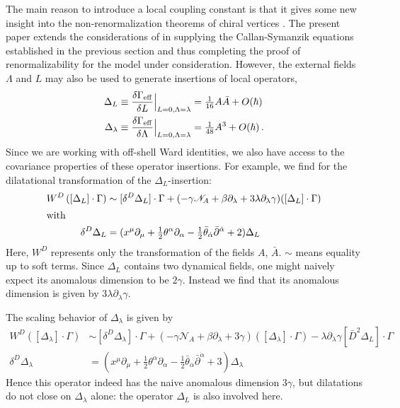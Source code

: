 \documentclass[a4paper,12pt]{article}
\newcommand{\N}{{\mathscr N}}
\def\pr{\partial}
\newcommand{\half}{{\textstyle \frac{1}{2}}}
\newcommand{\Geff}{\Gamma_{\rm eff}}
\newcommand{\al}{\alpha}
\newcommand{\da}{{\dot\alpha}}
\newcommand{\tfr}[2]{{\textstyle \frac{#1}{#2}}}
\newcommand{\fdq}[2]{\frac{\delta #1}{\delta #2}}
\begin{document}
The main reason to introduce a local coupling constant is that it gives
some new insight into the non-renormalization theorems of chiral vertices
\cite{FK}. The present paper extends the considerations of \cite{FK} in
supplying the Callan-Symanzik equations established in the previous
section and thus completing the proof of renormalizability for the model
under consideration.
However, the external fields $\Lambda$ and $L$ may also be used to generate
insertions of local operators,
\begin{align}
\Delta_L &\equiv \fdq{\Geff}{L} \Bigr|_{L=0,\Lambda=\lambda} = \tfr{1}{16} A \bar A + O(\hbar)\\
\Delta_\lambda &\equiv \fdq{\Geff}{\Lambda} \Bigr|_{L=0,\Lambda=\lambda} = \tfr{1}{48} A^3 + O(\hbar)\,.
\end{align}
Since we are working with off-shell Ward
identities, we also have access to the covariance properties of these
operator insertions. 
For example, we find for the dilatational transformation of the
$\Delta_L$-insertion: 
\begin{align}
W^D \left( [\Delta_L]\cdot \Gamma\right) &\sim [\delta^D \Delta_L]\cdot \Gamma
+ (-\gamma \N_A + \beta \pr_\lambda + 3 \lambda \pr_\lambda \gamma)
([\Delta_L]\cdot\Gamma) \label{DeltaLtrans}\\
\intertext{with}
\delta^D \Delta_L &= (x^\mu\pr_\mu + \half \theta^\al \pr_\al -\half
\bar\theta_\da \bar\pr^\da +2) \Delta_L \label{DeltaLtransD}
\end{align}
Here, $W^D$ represents only the transformation of the fields $A$, $\bar
A$. $\sim$ means equality up to soft terms. 
Since $\Delta_L$ contains two dynamical fields, one might naively expect
its anomalous dimension to be $2\gamma$. Instead we find that its
anomalous dimension is given by $ 3 \lambda \pr_\lambda \gamma$.

The scaling behavior of $\Delta_\lambda$ is given by
\begin{align}
W^D  \left( [\Delta_\lambda ]\cdot \Gamma\right) &\sim  [\delta^D
\Delta_\lambda]\cdot \Gamma + (-\gamma \N_A + \beta \pr_\lambda + 3\gamma)
([\Delta_\lambda]\cdot\Gamma)  - \lambda\pr_\lambda \gamma [\bar D^2
\Delta_L]\cdot\Gamma  \\
\delta^D \Delta_\lambda &= (x^\mu\pr_\mu + \half \theta^\al \pr_\al -\half
\bar\theta_\da \bar\pr^\da +3) \Delta_\lambda
\end{align}
Hence this operator indeed has the naive anomalous dimension $3\gamma$, but
dilatations do not close on $\Delta_\lambda$ alone: the
operator $\Delta_L$ is also involved here.
\end{document}

